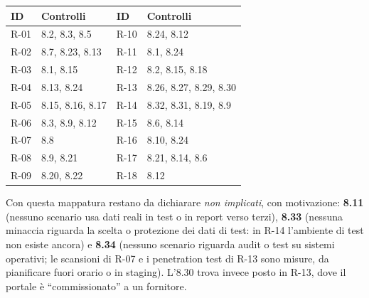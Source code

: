 \begin{integrazione}
\small
\begin{tabularx}{\linewidth}{l X l X}
\toprule
\textbf{ID} & \textbf{Controlli} & \textbf{ID} & \textbf{Controlli} \\ \midrule
R-01 & 8.2, 8.3, 8.5 & R-10 & 8.24, 8.12 \\
R-02 & 8.7, 8.23, 8.13 & R-11 & 8.1, 8.24 \\
R-03 & 8.1, 8.15 & R-12 & 8.2, 8.15, 8.18 \\
R-04 & 8.13, 8.24 & R-13 & 8.26, 8.27, 8.29, 8.30 \\
R-05 & 8.15, 8.16, 8.17 & R-14 & 8.32, 8.31, 8.19, 8.9 \\
R-06 & 8.3, 8.9, 8.12 & R-15 & 8.6, 8.14 \\
R-07 & 8.8 & R-16 & 8.10, 8.24 \\
R-08 & 8.9, 8.21 & R-17 & 8.21, 8.14, 8.6 \\
R-09 & 8.20, 8.22 & R-18 & 8.12 \\ \bottomrule
\end{tabularx}
\medskip

\noindent Con questa mappatura restano da dichiarare \emph{non implicati}, con motivazione: \textbf{8.11}
(nessuno scenario usa dati reali in test o in report verso terzi), \textbf{8.33} (nessuna minaccia riguarda
la scelta o protezione dei dati di test: in R-14 l'ambiente di test non esiste ancora) e \textbf{8.34}
(nessuno scenario riguarda audit o test su sistemi operativi; le scansioni di R-07 e i penetration test di
R-13 sono misure, da pianificare fuori orario o in staging). L'8.30 trova invece posto in R-13, dove il
portale è ``commissionato'' a un fornitore.
\end{integrazione}


